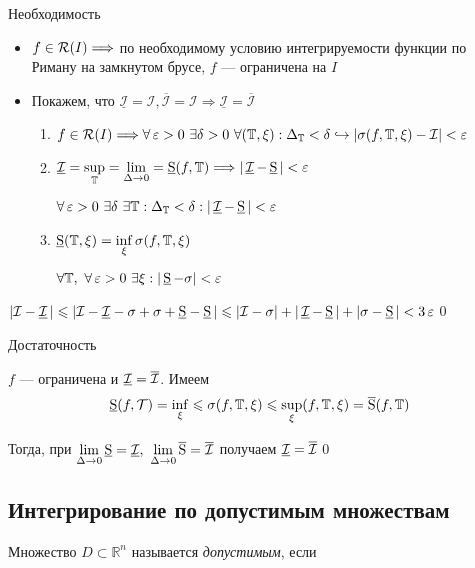 \documentclass[a4paper, 10pt]{article}
\begin{document}
\proof Необходимость 
\begin{itemize}
    \item $f\in\mathcal{R}(I)\Longrightarrow$ по необходимому условию интегрируемости функции по Риману на замкнутом брусе, $f$ — ограничена на $I$
    \item Покажем, что $\underline{\mathcal{I}}=\mathcal{I},\overline{\mathcal{I}}=\mathcal{I}\Longrightarrow\underline{\mathcal{I}}=\overline{\mathcal{I}}$
    
    \begin{enumerate}
        \item $f\in\riman{I}\Longrightarrow\forall \ve >0\ \exists \delta >0\ \forall(\mathbb{T},\xi):\Delta_{\mathbb{T}}<\delta\hookrightarrow|\sigma(f,\mathbb{T},\xi)-\mathcal{I}|<\ve$
        \item $\operatorname{\underline{\mathcal{I}}}=\sup\limits_{\mathbb{T}}=\lim\limits_{\Delta\rightarrow 0}=\operatorname{\underline{S}}(f,\mathbb{T})\Longrightarrow |\operatorname{\underline{\mathcal{I}}}-\operatorname{\underline{S}}|<\operatorname{\varepsilon}$
        
        $\forall \ve>0\ \exists\delta\ \exists\mathbb{T}:\Delta_{\mathbb{T}}<\delta: |\ui-\us|<\ve$
        \item $\operatorname{\underline{S}}(\mathbb{T},\xi)=\inf\limits_{\xi}\sigma(f,\mathbb{T},\xi)$
        
        $\forall\mathbb{T},\ \forall \ve>0\ \exists \xi:|\us-\sigma|<\ve$
    \end{enumerate}
\end{itemize}

$|\mathcal{I}-\operatorname{\underline{\mathcal{I}}}|\leqslant|\mathcal{I}-{\operatorname{\underline{\mathcal{I}}}}-\sigma+\sigma+{\operatorname{\underline{S}}}-\operatorname{\underline{S}}|\leqslant|\mathcal{I}-\sigma|+|\operatorname{\underline{\mathcal{I}}}-\operatorname{\underline{S}}|+|\sigma-\operatorname{\underline{S}}|<3\operatorname{\varepsilon}$\qed

\proof Достаточность

$f$ — ограничена и $\operatorname{\underline{\mathcal{I}}}=\operatorname{\overline{\mathcal{I}}}$. Имеем 
\begin{equation*}
    \operatorname{\underline{S}}(f,\mathcal{T})=\inf\limits_{\xi}\leqslant\sigma(f,\mathbb{T},\xi)\leqslant \sup\limits_{\xi}(f,\mathbb{T},\xi)=\operatorname{\overline{S}}(f,\mathbb{T})
\end{equation*}

Тогда, при $\lim\limits_{\Delta\rightarrow 0} \operatorname{\underline{S}}=\operatorname{\underline{\mathcal{I}}},\ \lim\limits_{\Delta\rightarrow0}\operatorname{\overline{S}}=\operatorname{\overline{\mathcal{I}}}$ получаем $\operatorname{\underline{\mathcal{I}}}=\operatorname{\overline{\mathcal{I}}}$\qed


\subsection{Интегрирование по допустимым множествам}

 Множество $D\subset\mathbb{R}^n$ называется \textit{допустимым}, если
\end{document}
